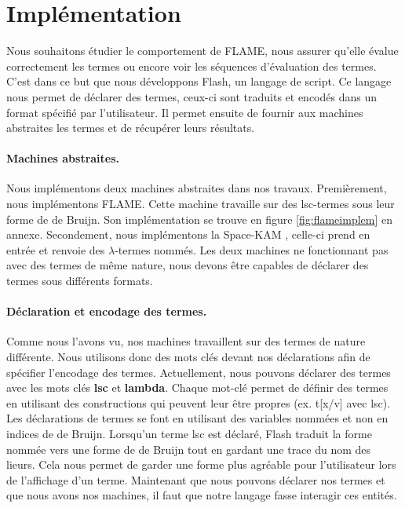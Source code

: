 \documentclass[a4paper, 11pt]{article}
\theoremstyle{definition}
\begin{document}
\section{Implémentation}
Nous souhaitons étudier le comportement de FLAME, nous assurer qu'elle évalue correctement les termes ou encore voir les séquences d'évaluation des termes.
C'est dans ce but que nous développons Flash, un langage de script.
Ce langage nous permet de déclarer des termes, ceux-ci sont traduits et encodés dans un format spécifié par l'utilisateur.
Il permet ensuite de fournir aux machines abstraites les termes et de récupérer leurs résultats.

\paragraph{Machines abstraites.}
Nous implémentons deux machines abstraites dans nos travaux.
Premièrement, nous implémentons FLAME. Cette machine travaille sur des lsc-termes sous leur forme de de Bruijn.
Son implémentation se trouve en figure \ref{fig:flameimplem} en annexe.
Secondement, nous implémentons la Space-KAM \cite{accattoli2022reasonable}, celle-ci prend en entrée et renvoie des $\lambda$-termes nommés.
Les deux machines ne fonctionnant pas avec des termes de même nature, nous devons être capables de déclarer des termes sous différents formats.

\paragraph{Déclaration et encodage des termes.}
Comme nous l'avons vu, nos machines travaillent sur des termes de nature différente.
Nous utilisons donc des mots clés devant nos déclarations afin de spécifier l'encodage des termes.
Actuellement, nous pouvons déclarer des termes avec les mots clés \textbf{lsc} et \textbf{lambda}.
Chaque mot-clé permet de définir des termes en utilisant des constructions qui peuvent leur être propres (ex. t[x/v] avec lsc).
Les déclarations de termes se font en utilisant des variables nommées et non en indices de de Bruijn.
Lorsqu'un terme lsc est déclaré, Flash traduit la forme nommée vers une forme de de Bruijn tout en gardant une trace du nom des lieurs.
Cela nous permet de garder une forme plus agréable pour l'utilisateur lors de l'affichage d'un terme.
Maintenant que nous pouvons déclarer nos termes et que nous avons nos machines, il faut que notre langage fasse interagir ces entités.
\end{document}
